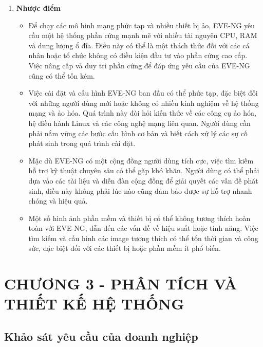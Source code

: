 \documentclass[13pt]{article}
\renewcommand{\thesubsection}{\thesection.\arabic{subsection}} %
\begin{document}
\begin{enumerate}
    \item \textbf{Nhược điểm}
    \begin{itemize}
        \item Để chạy các mô hình mạng phức tạp và nhiều thiết bị ảo, EVE-NG yêu cầu một hệ thống phần cứng mạnh mẽ với nhiều tài nguyên CPU, RAM và dung lượng ổ đĩa. Điều này có thể là một thách thức đối với các cá nhân hoặc tổ chức không có điều kiện đầu tư vào phần cứng cao cấp. Việc nâng cấp và duy trì phần cứng để đáp ứng yêu cầu của EVE-NG cũng có thể tốn kém.
        \item Việc cài đặt và cấu hình EVE-NG ban đầu có thể phức tạp, đặc biệt đối với những người dùng mới hoặc không có nhiều kinh nghiệm về hệ thống mạng và ảo hóa. Quá trình này đòi hỏi kiến thức về các công cụ ảo hóa, hệ điều hành Linux và các công nghệ mạng liên quan. Người dùng cần phải nắm vững các bước cấu hình cơ bản và biết cách xử lý các sự cố phát sinh trong quá trình cài đặt.
        \item Mặc dù EVE-NG có một cộng đồng người dùng tích cực, việc tìm kiếm hỗ trợ kỹ thuật chuyên sâu có thể gặp khó khăn. Người dùng có thể phải dựa vào các tài liệu và diễn đàn cộng đồng để giải quyết các vấn đề phát sinh, điều này không phải lúc nào cũng đảm bảo được sự hỗ trợ nhanh chóng và hiệu quả.
        \item Một số hình ảnh phần mềm và thiết bị có thể không tương thích hoàn toàn với EVE-NG, dẫn đến các vấn đề về hiệu suất hoặc tính năng. Việc tìm kiếm và cấu hình các image tương thích có thể tốn thời gian và công sức, đặc biệt đối với các thiết bị hoặc phần mềm ít phổ biến.
    \end{itemize}
\end{enumerate}

\newpage
\renewcommand{\thesubsection}{\thesection.\arabic{subsection}} %
\setcounter{section}{3} %
\setcounter{subsection}{0}
\section*{CHƯƠNG 3 - PHÂN TÍCH VÀ THIẾT KẾ HỆ THỐNG}
\subsection{Khảo sát yêu cầu của doanh nghiệp}
\end{document}
